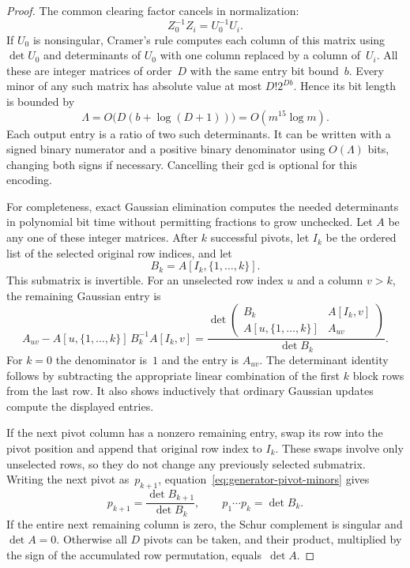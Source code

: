 \begin{proof}
The common clearing factor cancels in normalization:
\begin{equation}
  Z_0^{-1}Z_i=U_0^{-1}U_i.
  \label{eq:generator-common-denominator}
\end{equation}
If $U_0$ is nonsingular, Cramer's rule computes each column of this
matrix using $\det U_0$ and determinants of $U_0$ with one column
replaced by a column of~$U_i$. All these are integer matrices of
order~$D$ with the same entry bit bound~$b$. Every minor of any such
matrix has absolute value at most $D!2^{Db}$. Hence its bit length
is bounded by
\begin{equation}
  \Lambda=O\bigl(D(b+\log(D+1))\bigr)
     =O(m^{15}\log m).
  \label{eq:generator-minor-bit-bound}
\end{equation}
Each output entry is a ratio of two such determinants. It can be
written with a signed binary numerator and a positive binary
denominator using $O(\Lambda)$ bits, changing both signs if
necessary. Cancelling their gcd is optional for this encoding.

For completeness, exact Gaussian elimination computes the needed
determinants in polynomial bit time without permitting fractions
to grow unchecked. Let $A$ be any one of these integer matrices.
After $k$ successful pivots, let $I_k$ be the ordered list of the
selected original row indices, and let
\[
  B_k=A[I_k,\{1,\ldots,k\}].
\]
This submatrix is invertible. For an unselected row index $u$ and
a column $v>k$, the remaining Gaussian entry is
\begin{equation}
  A_{uv}-A[u,\{1,\ldots,k\}]\,
         B_k^{-1}A[I_k,v]
   =\frac{
       \det\begin{pmatrix}
         B_k&A[I_k,v]\\
         A[u,\{1,\ldots,k\}]&A_{uv}
       \end{pmatrix}}
       {\det B_k}.
  \label{eq:generator-pivot-minors}
\end{equation}
For $k=0$ the denominator is~$1$ and the entry is $A_{uv}$.
The determinant identity follows by subtracting the appropriate
linear combination of the first $k$ block rows from the last row.
It also shows inductively that ordinary Gaussian updates compute
the displayed entries.

If the next pivot column has a nonzero remaining entry, swap its
row into the pivot position and append that original row index to
$I_k$. These swaps involve only unselected rows, so they do not
change any previously selected submatrix. Writing the next pivot
as~$p_{k+1}$, equation~\eqref{eq:generator-pivot-minors} gives
\[
  p_{k+1}=\frac{\det B_{k+1}}{\det B_k},
  \qquad p_1\cdots p_k=\det B_k.
\]
If the entire next remaining column is zero, the Schur complement
is singular and $\det A=0$. Otherwise all $D$ pivots can be taken,
and their product, multiplied by the sign of the accumulated row
permutation, equals~$\det A$.


\end{proof}
